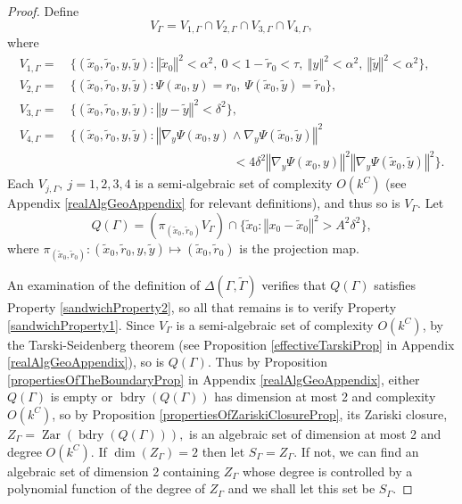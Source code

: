 \documentclass[reqno]{amsart}
\theoremstyle{definition}
\theoremstyle{remark}
\theoremstyle{remark}
\newcommand{\norm}[1]{\left\Vert#1\right\Vert}
\newcommand{\bdry}{\operatorname{bdry}}
\newcommand{\zar}{\operatorname{Zar}}
\begin{document}
\begin{proof}
Define
\begin{equation}
V_{\Gamma}=V_{1,\Gamma}\cap V_{2,\Gamma}\cap V_{3,\Gamma}\cap V_{4,\Gamma},
\end{equation}
where
\begin{align*}
V_{1,\Gamma}=&\ \{(\tilde x_0,\tilde r_0,y,\tilde y)\colon \norm{\tilde x_0}^2<\alpha^2,\ 0<1-\tilde r_0<\tau,\ \norm{y}^2<\alpha^2,\  \norm{\tilde y}^2<\alpha^2\},\\
V_{2,\Gamma}=&\ \{(\tilde x_0,\tilde r_0,y,\tilde y)\colon\Psi(x_0,y)=r_0,\ \Psi(\tilde x_0,\tilde y)=\tilde r_0\},\\
V_{3,\Gamma}=&\ \{(\tilde x_0,\tilde r_0,y,\tilde y)\colon \norm{y-\tilde y}^2 < \delta^2\},\\
V_{4,\Gamma}=&\ \{(\tilde x_0,\tilde r_0,y,\tilde y)\colon \norm{\nabla_y \Psi(x_0,y) \wedge \nabla_y \Psi(\tilde x_0,\tilde y)}^2 \\
&\phantom{\{(\tilde x_0,\tilde r_0,y,\tilde y)\colon \norm{\nabla_y \Psi(x_0,y)}} <4\delta^2 \norm{\nabla_y \Psi(x_0,y)}^2\norm{\nabla_y \Psi(\tilde x_0,\tilde y)}^2\}.
\end{align*}
Each $V_{j,\Gamma},\ j=1,2,3,4$ is a semi-algebraic set of complexity $O(k^C)$ (see Appendix \ref{realAlgGeoAppendix} for relevant definitions), and thus so is $V_{\Gamma}.$ Let
\begin{equation}
Q(\Gamma)=(\pi_{(\tilde x_0,\tilde r_0)}V_{\Gamma})\cap\{\tilde x_0\colon \norm{x_0-\tilde x_0}^2>A^2\delta^2\},
\end{equation}
where $\pi_{(\tilde x_0,\tilde r_0)}\colon (\tilde x_0,\tilde r_0,y,\tilde y)\mapsto (\tilde x_0,\tilde r_0)$ is the projection map.

An examination of the definition of $\Delta(\Gamma,\tilde\Gamma)$ verifies that $Q(\Gamma)$ satisfies Property \ref{sandwichProperty2}, so all that remains is to verify Property \ref{sandwichProperty1}. Since $V_{\Gamma}$ is a semi-algebraic set of complexity $O(k^C)$, by the Tarski-Seidenberg theorem (see Proposition \ref{effectiveTarskiProp} in Appendix \ref{realAlgGeoAppendix}), so is $Q(\Gamma)$. Thus by Proposition  \ref{propertiesOfTheBoundaryProp} in Appendix \ref{realAlgGeoAppendix}, either $Q(\Gamma)$ is empty or $\bdry(Q(\Gamma))$ has dimension at most 2 and complexity $O(k^C)$, so by Proposition \ref{propertiesOfZariskiClosureProp}, its Zariski closure, $Z_\Gamma=\zar(\bdry(Q(\Gamma))),$ is an algebraic set of dimension at most 2 and degree $O(k^C)$. If $\dim(Z_\Gamma)=2$ then let $S_\Gamma=Z_\Gamma$. If not, we can find an algebraic set of dimension 2 containing $Z_\Gamma$ whose degree is controlled by a polynomial function of the degree of $Z_\Gamma$ and we shall let this set be $S_\Gamma$.
\end{proof}
\end{document}

